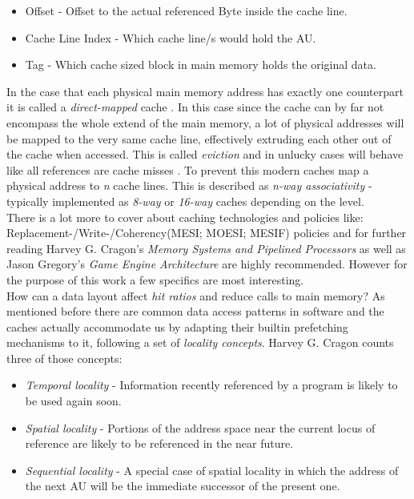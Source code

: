 \begin{itemize}
	\item Offset - Offset to the actual referenced Byte inside the cache line.
	\item Cache Line Index - Which cache line/s would hold the AU.
	\item Tag - Which cache sized block in main memory holds the original data.
\end{itemize}
In the case that each physical main memory address has exactly one counterpart it is called a \textit{direct-mapped} cache . In this case since the cache can by far not encompass the whole extend of the main memory, a lot of physical addresses will be mapped to the very same cache line, effectively extruding each other out of the cache when accessed. This is called \textit{eviction} and in unlucky cases will behave like all references are cache misses . To prevent this modern caches map a physical address to \textit{n} cache lines. This is described as \textit{n-way associativity} - typically implemented as \textit{8-way} or \textit{16-way} caches depending on the level.\\
There is a lot more to cover about caching technologies and policies like: Replacement-/Write-/Coherency(MESI; MOESI; MESIF) policies and for further reading Harvey G. Cragon's \textit{Memory Systems and Pipelined Processors} as well as Jason Gregory's \textit{Game Engine Architecture} are highly recommended. However for the purpose of this work a few specifics are most interesting.\\
How can a data layout affect \textit{hit ratios} and reduce calls to main memory? As mentioned before there are common data access patterns in software and the caches actually accommodate us by adapting their builtin prefetching mechanisms to it, following a set of \textit{locality concepts}. Harvey G. Cragon counts three of those concepts: 
\begin{itemize}
	\item \textit{Temporal locality} - Information recently referenced by a program is likely to be used again soon.
	\item \textit{Spatial locality} - Portions of the address space near the current locus of reference are likely to be referenced in the near future.
	\item \textit{Sequential locality} - A special case of spatial locality in which the address of the next AU will be the immediate successor of the present one.
\end{itemize}
